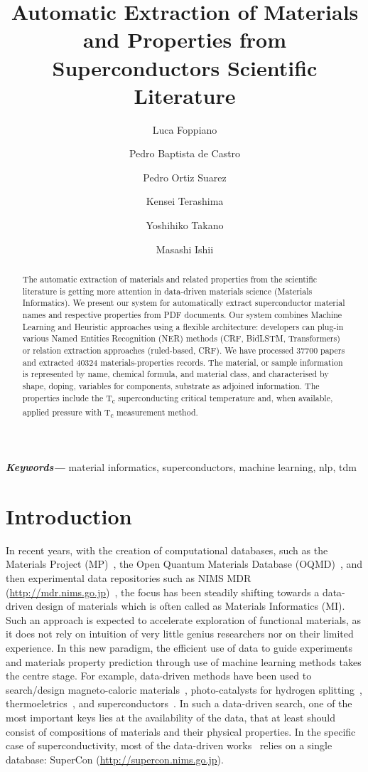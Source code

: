 \documentclass{article}
\title{Automatic Extraction of Materials and Properties from Superconductors Scientific Literature}
\author[1]{Luca Foppiano}
\author[2]{Pedro Baptista de Castro}
\author[3]{Pedro Ortiz Suarez}
\author[2]{Kensei Terashima}
\author[2]{Yoshihiko Takano}
\author[1]{Masashi Ishii}
\affil[1]{Material Database Group, MaDIS, NIMS, Tsukuba, Japan}
\affil[2]{Nano Frontier Superconducting Materials Group, MANA, NIMS, Tsukuba, Japan}
\affil[3]{Data and Web Science Group, University of Mannheim, Mannheim, Germany}
\providecommand{\keywords}[1]
{
  \small	
  \textbf{\textit{Keywords---}} #1
}
\begin{document}
\maketitle

\begin{abstract}
The automatic extraction of materials and related properties from the scientific literature is getting more attention in data-driven materials science (Materials Informatics). 
We present our system for automatically extract superconductor material names and respective properties from PDF documents.
Our system combines Machine Learning and Heuristic approaches using a flexible architecture: developers can plug-in various Named Entities Recognition (NER) methods (CRF, BidLSTM, Transformers) or relation extraction approaches (ruled-based, CRF).
We have processed 37700 papers and extracted 40324 materials-properties records. 
The material, or sample information is represented by name, chemical formula, and material class, and characterised by shape, doping, variables for components, substrate as adjoined information.
The properties include the T\textsubscript{c} superconducting critical temperature and, when available, applied pressure with T\textsubscript{c} measurement method.
\end{abstract}

\keywords{material informatics, superconductors, machine learning, nlp, tdm}

\section{Introduction}
In recent years, with the creation of computational databases, such as the Materials Project (MP)~\cite{materialsprojectJain2013}, the Open Quantum Materials Database (OQMD)~\cite{oqmdkirklin2015open}, and then experimental data repositories such as NIMS MDR (\url{http://mdr.nims.go.jp})~\cite{ranganathan_anusha_2019_3553963}, the focus has been steadily shifting towards a data-driven design of materials which is often called as Materials Informatics (MI). 
Such an approach is expected to accelerate exploration of functional materials, as it does not rely on intuition of very little genius researchers nor on their limited experience.
In this new paradigm, the efficient use of data to guide experiments and materials property prediction through use of machine learning methods takes the centre stage. 
For example, data-driven methods have been used to search/design magneto-caloric materials~\cite{Bocarsly2017,Castro2020-12,court2021inverse}, photo-catalysts for hydrogen splitting~\cite{xiong2021optimizing}, thermoeletrics~\cite{iwasaki2019machine}, and superconductors~\cite{stanev_machine_2017}. 
In such a data-driven search, one of the most important keys lies at the availability of the data, that at least should consist of compositions of materials and their physical properties. 
In the specific case of superconductivity, most of the data-driven works~\cite{stanev_machine_2017, le2020critical,Hamlin2019SuperconductivityNR} relies on a single database: SuperCon (\url{http://supercon.nims.go.jp}). 
\end{document}
